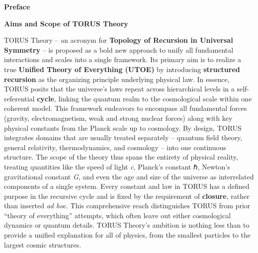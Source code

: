 \documentclass[
]{article}
\author{}
\date{}
\begin{document}
\textbf{Preface}

\textbf{Aims and Scope of TORUS Theory}

TORUS Theory -- an acronym for \textbf{Topology of Recursion in
Universal Symmetry} -- is proposed as a bold new approach to unify all
fundamental interactions and scales into a single framework. Its primary
aim is to realize a true \textbf{Unified Theory of Everything (UTOE)} by
introducing \textbf{structured recursion} as the organizing principle
underlying physical law. In essence, TORUS posits that the universe's
laws repeat across hierarchical levels in a self-referential
\textbf{cycle}, linking the quantum realm to the cosmological scale
within one coherent model. This framework endeavors to encompass all
fundamental forces (gravity, electromagnetism, weak and strong nuclear
forces) along with key physical constants from the Planck scale up to
cosmology. By design, TORUS integrates domains that are usually treated
separately -- quantum field theory, general relativity, thermodynamics,
and cosmology -- into one continuous structure. The scope of the theory
thus spans the entirety of physical reality, treating quantities like
the speed of light \emph{c}, Planck's constant ℏ, Newton's gravitational
constant \emph{G}, and even the age and size of the universe as
interrelated components of a single system. Every constant and law in
TORUS has a defined purpose in the recursive cycle and is fixed by the
requirement of \textbf{closure}, rather than inserted \emph{ad hoc}.
This comprehensive reach distinguishes TORUS from prior ``theory of
everything'' attempts, which often leave out either cosmological
dynamics or quantum details. TORUS Theory's ambition is nothing less
than to provide a unified explanation for all of physics, from the
smallest particles to the largest cosmic structures.
\end{document}
